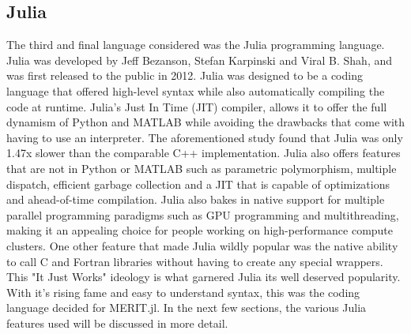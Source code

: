 \subsection{Julia}
The third and final language considered was the Julia programming language. Julia was developed by Jeff Bezanson, Stefan
Karpinski and Viral B. Shah, and was first released to the public in 2012. Julia was designed to be a coding language
that offered high-level syntax while also automatically compiling the code at runtime. Julia's Just In Time (JIT) compiler,
allows it to offer the full dynamism of Python and MATLAB while avoiding the drawbacks that come with having to use an
interpreter. The aforementioned study found that Julia was only 1.47x slower than the comparable C++ implementation.
Julia also offers features that are not in Python or MATLAB such as parametric polymorphism, multiple dispatch,
efficient garbage collection and a JIT that is capable of optimizations and ahead-of-time compilation. Julia also bakes
in native support for multiple parallel programming paradigms such as GPU programming and multithreading, making it an
appealing choice for people working on high-performance compute clusters. One other feature that made Julia wildly
popular was the native ability to call C and Fortran libraries without having to create any special wrappers. This "It
Just Works" ideology is what garnered Julia its well deserved popularity. With it's rising fame and easy to understand
syntax, this was the coding language decided for MERIT.jl. In the next few sections, the various Julia features used
will be discussed in more detail.
